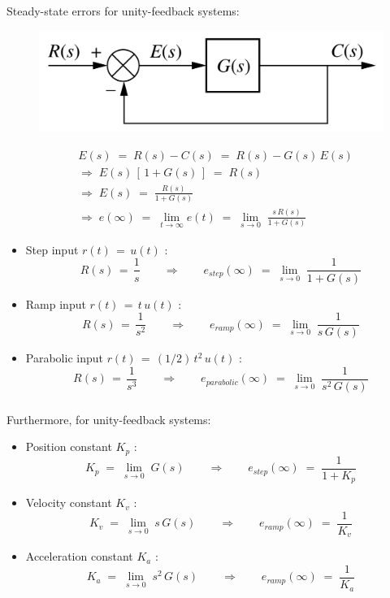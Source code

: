\documentclass[ 10pt, xcolor = dvipsnames]{beamer}
\begin{document}
\begin{frame}[allowframebreaks]
\frametitle{\insertsection}

Steady-state errors for unity-feedback systems: 
\fullskip

\begin{figure}
\centering
\includegraphics[width=0.5\columnwidth]{figures/Nise_Fig-7-3b.jpg}
\end{figure}
\begin{align*}
& E(s) \; = \; R(s) - C(s) \; = \; R(s) - G(s) \, E(s) \\[1ex]
& \Longrightarrow \; E(s) \, [ \, 1 + G(s) \, ] \; = \; R(s) \\[1ex]
& \Longrightarrow \; E(s) \; = \; \frac{R(s)}{1 + G(s)} \\[1ex]
& \Longrightarrow \; e(\infty) \; = \; 
\lim_{ t \rightarrow \infty } e(t) \; = \; 
\lim_{ s \rightarrow 0 } \; \frac{ s \, R(s) }{1 + G(s)}
\end{align*}
\framebreak

\begin{itemize}
\item Step input $r(t) \, = \, u(t)$ :
\[
R(s) \, = \, \frac{1}{s} \qquad \Longrightarrow \qquad
e_{step}(\infty) \; = \; 
\lim_{ s \rightarrow 0 } \; \frac{1}{1 + G(s)}
\]
\item Ramp input $r(t) \, = \, t \, u(t)$ :
\[
R(s) \, = \, \frac{1}{s^2} \qquad \Longrightarrow \qquad
e_{ramp}(\infty) \; = \; 
\lim_{ s \rightarrow 0 } \; \frac{1}{s \, G(s)}
\]
\item Parabolic input $r(t) \, = \, (1/2) \, t^2 \, u(t)$ :
\[
R(s) \, = \, \frac{1}{s^3} \qquad \Longrightarrow \qquad
e_{parabolic}(\infty) \; = \; 
\lim_{ s \rightarrow 0 } \; \frac{1}{s^2 \, G(s)}
\]
\end{itemize}

\end{frame}

\begin{frame}[allowframebreaks]
\frametitle{\insertsection}

Furthermore, for unity-feedback systems: 
\begin{itemize}
\item Position constant $K_p$ :
\[
K_p \; = \; \lim_{ s \rightarrow 0 } \; G(s)
\qquad \Longrightarrow \qquad
e_{step}(\infty) \; = \; \frac{1}{1 + K_p}
\]
\item Velocity constant $K_v$ :
\[
K_v \; = \; \lim_{ s \rightarrow 0 } \; s \,G(s)
\qquad \Longrightarrow \qquad
e_{ramp}(\infty) \; = \; \frac{1}{K_v}
\]
\item Acceleration constant $K_a$ :
\[
K_a \; = \; \lim_{ s \rightarrow 0 } \; s^2 \,G(s)
\qquad \Longrightarrow \qquad
e_{ramp}(\infty) \; = \; \frac{1}{K_a}
\]
\end{itemize}

\end{frame}
\end{document}
